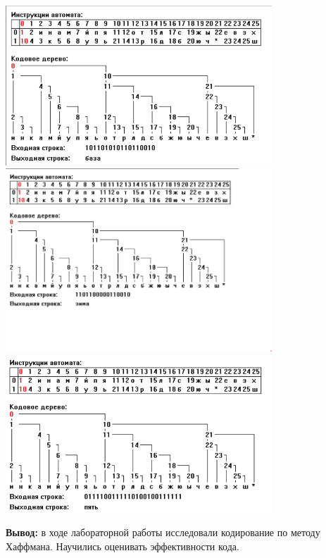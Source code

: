 \documentclass[a4paper,14pt]{extarticle}
\begin{document}
\begin{center}
    \includegraphics[width=100mm]{huf1}\\
    \includegraphics[width=100mm]{huf2}\\
    \includegraphics[width=100mm]{huf3}\\
\end{center}
\textbf{Вывод: } в ходе лабораторной работы исследовали кодирование по методу Хаффмана. Научились оценивать эффективности кода.
\end{document}
